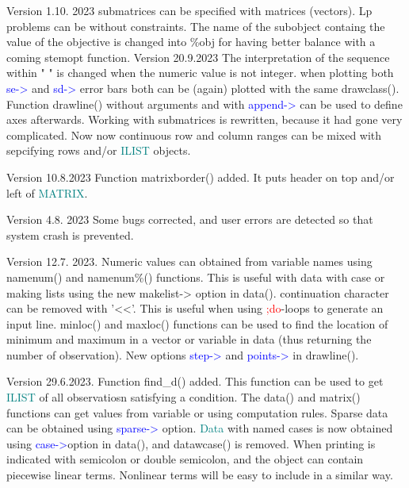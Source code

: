  
 
Version 1.10. 2023 submatrices can be specified with matrices (vectors). Lp problems 
can be without constraints. The name of the subobject containg the value 
of the objective is changed into \%obj for having better balance with a coming stemopt function. 
Version 20.9.2023 The interpretation of the sequence within " " is changed when the numeric value is not integer. 
when plotting both \textcolor{blue}{se->} and \textcolor{blue}{sd->} error bars both can be (again) plotted with the same \textcolor{VioletRed}{drawclass}(). 
Function \textcolor{VioletRed}{drawline}() without arguments and with \textcolor{blue}{append->} can be used to define axes afterwards. 
Working with submatrices is rewritten, because it had gone very complicated. Now now continuous 
row and column ranges can be mixed with sepcifying rows and/or \textcolor{teal}{ILIST} objects. 
 
Version 10.8.2023 Function \textcolor{VioletRed}{matrixborder}() added. It puts header on top and/or left of \textcolor{teal}{MATRIX}. 
 
Version 4.8. 2023 Some bugs corrected, and user errors are detected so that system crash is prevented. 
 
Version 12.7. 2023. Numeric values can obtained from variable names using \textcolor{VioletRed}{namenum}() and 
namenum\%() functions. This is useful with data with case or making lists using the new makelist-> option in \textcolor{VioletRed}{data}(). 
continuation character can be removed with '<<'. This is useful when using \textcolor{Red}{;do}-loops to generate 
an input line. \textcolor{VioletRed}{minloc}() and \textcolor{VioletRed}{maxloc}() functions can be used to find the location of minimum 
and maximum in a vector or variable in data (thus returning the number of observation). 
New options \textcolor{blue}{step->} and \textcolor{blue}{points->} in \textcolor{VioletRed}{drawline}(). 
 
Version 29.6.2023. Function \textcolor{VioletRed}{find\_d}() added. This function can be used to get \textcolor{teal}{ILIST} 
of all observatiosn satisfying a condition. The \textcolor{VioletRed}{data}() and \textcolor{VioletRed}{matrix}() functions can get values 
from variable or using computation rules. Sparse data can be obtained using \textcolor{blue}{sparse->} 
option. \textcolor{teal}{Data} with named cases is now obtained using \textcolor{blue}{case->}option in \textcolor{VioletRed}{data}(), 
and \textcolor{VioletRed}{datawcase}() is removed. When printing is indicated with semicolon or double semicolon, and the object 
can contain piecewise linear terms. Nonlinear terms will be easy to include in  a similar way. 
 

